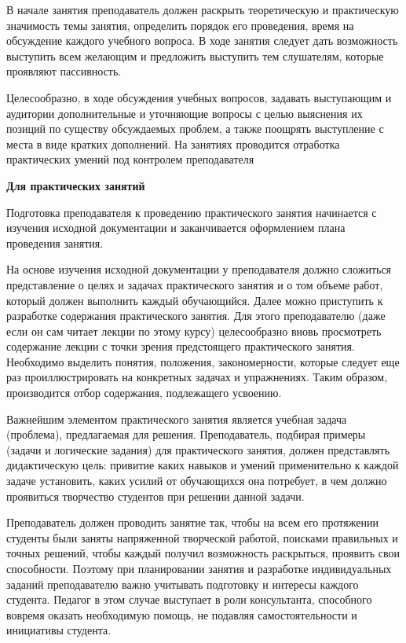 \documentclass[a4paper, 12pt]{article}
\begin{document}
В начале занятия преподаватель должен раскрыть теоретическую и практическую значимость темы занятия, определить порядок его проведения, время на обсуждение каждого учебного вопроса. В ходе занятия следует дать возможность выступить всем желающим и предложить выступить тем слушателям, которые проявляют пассивность.

Целесообразно, в ходе обсуждения учебных вопросов, задавать выступающим и аудитории дополнительные и уточняющие вопросы с целью выяснения их позиций по существу обсуждаемых проблем, а также поощрять выступление с места в виде кратких дополнений. На занятиях проводится отработка практических умений под контролем преподавателя

\vspace{8pt}
{\bf Для практических занятий}

Подготовка преподавателя к проведению практического занятия начинается с изучения исходной документации и заканчивается оформлением плана проведения занятия.

На основе изучения исходной документации у преподавателя должно сложиться представление о целях и задачах практического занятия и о том объеме работ, который должен выполнить каждый обучающийся. Далее можно приступить к разработке содержания практического занятия. Для этого преподавателю (даже если он сам читает лекции по этому курсу) целесообразно вновь просмотреть содержание лекции с точки зрения предстоящего практического занятия. Необходимо выделить понятия, положения, закономерности, которые следует еще раз проиллюстрировать на конкретных задачах и упражнениях. Таким образом, производится отбор содержания, подлежащего усвоению.

Важнейшим элементом практического занятия является учебная задача (проблема), предлагаемая для решения. Преподаватель, подбирая примеры (задачи и логические задания) для практического занятия, должен представлять дидактическую цель: привитие каких навыков и умений применительно к каждой задаче установить, каких усилий от обучающихся она потребует, в чем должно проявиться творчество студентов при решении данной задачи.

Преподаватель должен проводить занятие так, чтобы на всем его протяжении студенты были заняты напряженной творческой работой, поисками правильных и точных решений, чтобы каждый получил возможность раскрыться, проявить свои способности. Поэтому при планировании занятия и разработке индивидуальных заданий преподавателю важно учитывать подготовку и интересы каждого студента. Педагог в этом случае выступает в роли консультанта,  способного вовремя оказать необходимую помощь, не подавляя самостоятельности и инициативы студента.
\end{document}
